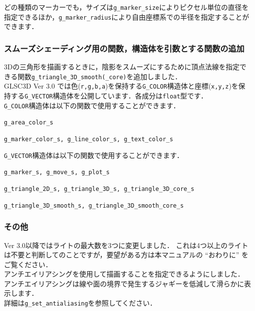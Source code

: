 \documentclass[platex,a4paper,12pt]{jsarticle}%
\begin{document}
どの種類のマーカーでも，サイズは\verb|g_marker_size|によりピクセル単位の直径を指定できるほか，\verb|g_marker_radius|により自由座標系での半径を指定することができます．

\subsubsection{スムーズシェーディング用の関数，構造体を引数とする関数の追加}
3Dの三角形を描画するときに，陰影をスムーズにするために頂点法線を指定できる関数\verb|g_triangle_3D_smooth(_core)|を追加しました．\\

GLSC3D Ver 3.0 では色(\verb|r,g,b,a|)を保持する\verb|G_COLOR|構造体と座標(\verb|x,y,z|)を保持する\verb|G_VECTOR|構造体を公開しています．各成分は\verb|float|型です．\\

\verb|G_COLOR|構造体は以下の関数で使用することができます．
\begin{description}
\item \verb|g_area_color_s|
\item \verb|g_marker_color_s, g_line_color_s, g_text_color_s|
\end{description}

\verb|G_VECTOR|構造体は以下の関数で使用することができます．
\begin{description}
\item \verb|g_marker_s, g_move_s, g_plot_s|
\item \verb|g_triangle_2D_s, g_triangle_3D_s, g_triangle_3D_core_s|
\item \verb|g_triangle_3D_smooth_s, g_triangle_3D_smooth_core_s|
\end{description}

\newpage
\subsubsection{その他}
Ver 3.0以降ではライトの最大数を3つに変更しました．
これは4つ以上のライトは不要と判断してのことですが，要望がある方は本マニュアルの ``おわりに'' をご覧ください．\\

アンチエイリアシングを使用して描画することを指定できるようにしました．\\
アンチエイリアシングは線や面の境界で発生するジャギーを低減して滑らかに表示します．\\
詳細は\verb|g_set_antialiasing|を参照してください．\\
\end{document}
